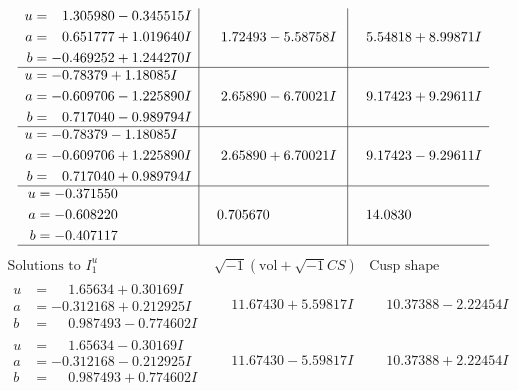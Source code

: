 \documentclass[1p]{elsarticle_modified}
\theoremstyle{definition}
\newcommand{\I}{\sqrt{-1}}
\begin{document}
$$\begin{array}{c|c|c}
\begin{aligned}
u &= \phantom{-}1.305980 - 0.345515 I \\
a &= \phantom{-}0.651777 + 1.019640 I \\
b &= -0.469252 + 1.244270 I\end{aligned}
 & \phantom{-}1.72493 - 5.58758 I & \phantom{-}5.54818 + 8.99871 I \\ \hline\begin{aligned}
u &= -0.78379 + 1.18085 I \\
a &= -0.609706 - 1.225890 I \\
b &= \phantom{-}0.717040 - 0.989794 I\end{aligned}
 & \phantom{-}2.65890 - 6.70021 I & \phantom{-}9.17423 + 9.29611 I \\ \hline\begin{aligned}
u &= -0.78379 - 1.18085 I \\
a &= -0.609706 + 1.225890 I \\
b &= \phantom{-}0.717040 + 0.989794 I\end{aligned}
 & \phantom{-}2.65890 + 6.70021 I & \phantom{-}9.17423 - 9.29611 I \\ \hline\begin{aligned}
u &= -0.371550\phantom{ +0.000000I} \\
a &= -0.608220\phantom{ +0.000000I} \\
b &= -0.407117\phantom{ +0.000000I}\end{aligned}
 & \phantom{-}0.705670\phantom{ +0.000000I} & \phantom{-}14.0830\phantom{ +0.000000I}\\
 \hline 
 \end{array}$$\newpage$$\begin{array}{c|c|c}  
\text{Solutions to }I^u_{1}& \I (\text{vol} + \sqrt{-1}CS) & \text{Cusp shape}\\
 \hline 
\begin{aligned}
u &= \phantom{-}1.65634 + 0.30169 I \\
a &= -0.312168 + 0.212925 I \\
b &= \phantom{-}0.987493 - 0.774602 I\end{aligned}
 & \phantom{-}11.67430 + 5.59817 I & \phantom{-}10.37388 - 2.22454 I \\ \hline\begin{aligned}
u &= \phantom{-}1.65634 - 0.30169 I \\
a &= -0.312168 - 0.212925 I \\
b &= \phantom{-}0.987493 + 0.774602 I\end{aligned}
 & \phantom{-}11.67430 - 5.59817 I & \phantom{-}10.37388 + 2.22454 I \\ \hline\begin{aligned}

\end{aligned}
\end{array}$$
\end{document}
